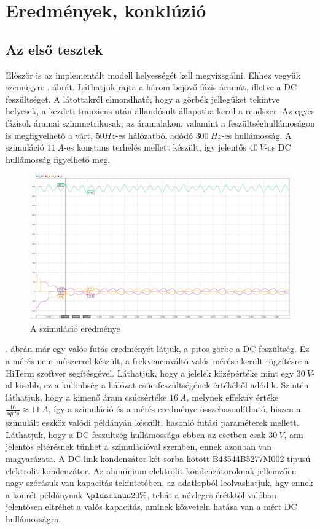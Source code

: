 \chapter{Eredmények, konklúzió}

\section{Az első tesztek}

Először is az implementált modell helyességét kell megvizsgálni. Ehhez vegyük szemügyre . ábrát. Láthatjuk rajta a három bejövő fázis áramát, illetve a DC feszültséget. A látottakról elmondható, hogy a görbék jellegüket tekintve helyesek, a kezdeti tranziens után állandósult állapotba kerül a rendszer. Az egyes fázisok áramai szimmetrikusak, az áramalakon, valamint a feszültséghullámoságon is megfigyelhető a várt, $50 Hz$-es hálózatból adódó $300\ Hz$-es hullámosság. A szimuláció $11\ A$-es konstans terhelés mellett készült, így jelentős $40\ V$-os DC hullámosság figyelhető meg.

\begin{figure}[H]
	\centering
	\includegraphics[width = \textwidth]{figures/continous_testrun_1.png}
	\caption{A szimuláció eredménye} 
	\label{fig:cont_run}
\end{figure}

. ábrán már egy valós futás eredményét látjuk, a pitos görbe a DC feszültség. Ez a mérés nem műszerrel készült, a frekvenciaváltó valós mérése került rögzítésre a HiTerm szoftver segítésgével. Láthatjuk, hogy a jelelek középértéke mint egy $30\ V$-al kisebb, ez a különbség a hálózat csúcsfeszültségének értékéből adódik. Szintén láthatjuk, hogy a kimenő áram csúcsértéke $16\ A$, melynek effektív értéke $\frac{16}{sqrt{s}} \approx 11\ A$, így a szimuláció és a mérés eredménye összehasonlítható, hiszen a szimulált eszköz valódi példányán készült, hasonló futási paraméterek mellett. Láthatjuk, hogy a DC feszültség hullámossága ebben az esetben csak $30\ V$, ami jelentős eltérésnek tűnhet a szimulációval szemben, ennek azonban van magyarázata. A DC-link kondenzátor két sorba kötött B43544B5277M002 típusú elektrolit kondenzátor. Az alumínium-elektrolit kondenzátoroknak jellemzően nagy szórásuk van kapacitás tekintetében, az adatlapból leolvashatjuk, hgy ennek a konrét példánynak $\plusminus 20\%$, tehát a névleges érétktől valóban jelentősen eltréhet a valós kapacitás, aminek közveteln hatása van a mért DC hullámosságra.

